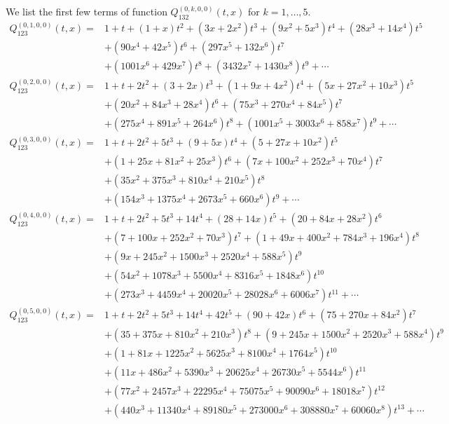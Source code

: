 \documentclass[
final,nomarks
]{dmtcs-episciences}
\newcommand{\Qmm}[1]{Q_{132}^{(#1)}(t,x)}
\newcommand{\Qm}[1]{Q_{123}^{(#1)}(t,x)}
\begin{document}
We list the first few terms of function \begin{math}\Qmm{0,k,0,0}\end{math} for \begin{math}k=1,\ldots,5\end{math}.
\begin{align}
\Qm{0,1,0,0}=&1+t+(1+x) t^2+\left(3 x+2 x^2\right) t^3+\left(9 x^2+5 x^3\right) t^4+\left(28
x^3+14 x^4\right) t^5\nonumber\\\nonumber
&+\left(90 x^4+42 x^5\right) t^6+\left(297 x^5+132
x^6\right) t^7\\
&+\left(1001 x^6+429 x^7\right) t^8+\left(3432 x^7+1430
x^8\right) t^9+\cdots
\\
\Qm{0,2,0,0}=&1+t+2 t^2+(3+2 x) t^3+\left(1+9 x+4 x^2\right) t^4+\left(5 x+27 x^2+10
x^3\right) t^5\nonumber\\\nonumber
&+\left(20 x^2+84 x^3+28 x^4\right) t^6+\left(75 x^3+270 x^4+84
x^5\right) t^7\\
&+\left(275 x^4+891 x^5+264 x^6\right) t^8+\left(1001 x^5+3003
x^6+858 x^7\right) t^9+\cdots
\end{align}
\begin{align}
\Qm{0,3,0,0}=&1+t+2 t^2+5 t^3+(9+5 x) t^4+\left(5+27 x+10 x^2\right) t^5\nonumber\\\nonumber
&+\left(1+25 x+81
x^2+25 x^3\right) t^6+\left(7 x+100 x^2+252 x^3+70 x^4\right) t^7\\\nonumber
&+\left(35
x^2+375 x^3+810 x^4+210 x^5\right) t^8\\
&+\left(154 x^3+1375 x^4+2673 x^5+660
x^6\right) t^9+\cdots
\\
\Qm{0,4,0,0}=&1+t+2 t^2+5 t^3+14 t^4+(28+14 x) t^5+\left(20+84 x+28 x^2\right)
t^6\nonumber\\\nonumber
&+\left(7+100 x+252 x^2+70 x^3\right) t^7+\left(1+49 x+400 x^2+784 x^3+196
x^4\right) t^8\\\nonumber
&+\left(9 x+245 x^2+1500 x^3+2520 x^4+588 x^5\right)
t^9\\\nonumber
&+\left(54 x^2+1078 x^3+5500 x^4+8316 x^5+1848 x^6\right) t^{10}\\
&+\left(273
x^3+4459 x^4+20020 x^5+28028 x^6+6006 x^7\right) t^{11}+\cdots
\\
\Qm{0,5,0,0}=&1+t+2 t^2+5 t^3+14 t^4+42 t^5+(90+42 x) t^6+\left(75+270 x+84 x^2\right)
t^7\nonumber\\\nonumber
&+\left(35+375 x+810 x^2+210 x^3\right) t^8+\left(9+245 x+1500 x^2+2520
x^3+588 x^4\right) t^9\\\nonumber
&+\left(1+81 x+1225 x^2+5625 x^3+8100 x^4+1764
x^5\right) t^{10}\\\nonumber
&+\left(11 x+486 x^2+5390 x^3+20625 x^4+26730 x^5+5544
x^6\right) t^{11}\\\nonumber
&+\left(77 x^2+2457 x^3+22295 x^4+75075 x^5+90090 x^6+18018
x^7\right) t^{12}\\
&+\left(440 x^3+11340 x^4+89180 x^5+273000 x^6+308880
x^7+60060 x^8\right) t^{13}+\cdots
\end{align}
\end{document}
